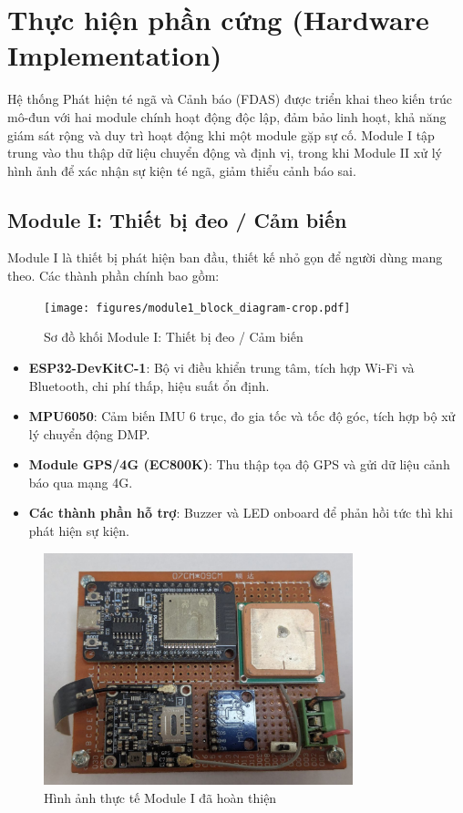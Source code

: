 
\section{Thực hiện phần cứng (Hardware Implementation)}
\label{sec:hardware_implementation}

Hệ thống Phát hiện té ngã và Cảnh báo (FDAS) được triển khai theo kiến trúc mô-đun với hai module chính hoạt động độc lập, đảm bảo linh hoạt, khả năng giám sát rộng và duy trì hoạt động khi một module gặp sự cố. Module I tập trung vào thu thập dữ liệu chuyển động và định vị, trong khi Module II xử lý hình ảnh để xác nhận sự kiện té ngã, giảm thiểu cảnh báo sai.

\subsection{Module I: Thiết bị đeo / Cảm biến}
\label{ssec:module_one}

Module I là thiết bị phát hiện ban đầu, thiết kế nhỏ gọn để người dùng mang theo. Các thành phần chính bao gồm:

\begin{figure}[H]
    \centering
    \texttt{[image: figures/module1\_block\_diagram-crop.pdf]}
    \caption{Sơ đồ khối Module I: Thiết bị đeo / Cảm biến}
    \label{fig:module1_block_diagram}
\end{figure}

\begin{itemize}
    \item \textbf{ESP32-DevKitC-1}: Bộ vi điều khiển trung tâm, tích hợp Wi-Fi và Bluetooth, chi phí thấp, hiệu suất ổn định.
    \item \textbf{MPU6050}: Cảm biến IMU 6 trục, đo gia tốc và tốc độ góc, tích hợp bộ xử lý chuyển động DMP.
    \item \textbf{Module GPS/4G (EC800K)}: Thu thập tọa độ GPS và gửi dữ liệu cảnh báo qua mạng 4G.
    \item \textbf{Các thành phần hỗ trợ}: Buzzer và LED onboard để phản hồi tức thì khi phát hiện sự kiện.
\end{itemize}

\begin{figure}[H]
    \centering
    \includegraphics[width=0.8\textwidth]{figures/real_board1.jpg}
    \caption{Hình ảnh thực tế Module I đã hoàn thiện}
    \label{fig:module1_photo}
\end{figure}

